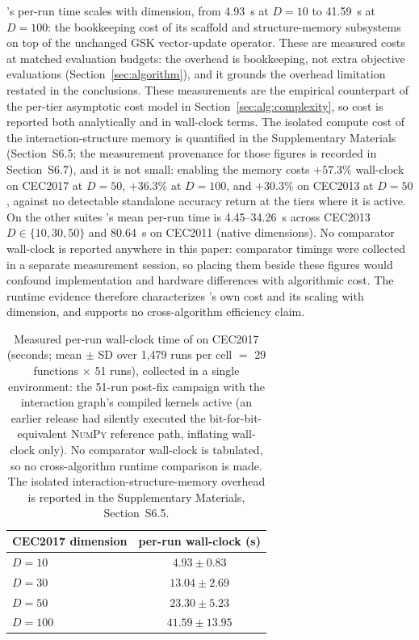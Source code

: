 \dtgsk{}'s per-run time scales with dimension, from 4.93~s at $D = 10$ to
41.59~s at $D = 100$: the bookkeeping cost of its scaffold and
structure-memory subsystems on top of the unchanged GSK vector-update operator. These are
measured costs at matched evaluation budgets: the overhead is bookkeeping, not
extra objective evaluations (Section~\ref{sec:algorithm}), and it grounds the
overhead limitation restated in the conclusions. These measurements are the
empirical counterpart of the per-tier asymptotic cost model in
Section~\ref{sec:alg:complexity}, so cost is reported both analytically and in
wall-clock terms. The isolated compute cost of
the interaction-structure memory is quantified in the Supplementary Materials
(Section~S6.5; the measurement provenance for those figures is recorded in
Section~S6.7), and it is not small: enabling the memory costs $+57.3\%$
wall-clock on CEC2017 at $D = 50$, $+36.3\%$ at $D = 100$, and $+30.3\%$ on
CEC2013 at $D = 50$, against no detectable standalone accuracy return at the
tiers where it is active. On the other suites \dtgsk{}'s mean per-run time is
4.45--34.26~s across CEC2013 $D \in \{10, 30, 50\}$ and 80.64~s on CEC2011
(native dimensions). No comparator wall-clock is reported anywhere in this
paper: comparator timings were collected in a separate measurement session, so
placing them beside these figures would confound implementation and hardware
differences with algorithmic cost. The runtime evidence therefore characterizes
\dtgsk{}'s own cost and its scaling with dimension, and supports no
cross-algorithm efficiency claim.

\begin{table}[H]
\caption{Measured per-run wall-clock time of \dtgsk{} on CEC2017 (seconds; mean
$\pm$ SD over 1{,}479 runs per cell $=$ 29 functions $\times$ 51 runs), collected
in a single environment: the 51-run post-fix campaign with the interaction
graph's compiled kernels active (an earlier release had silently executed the
bit-for-bit-equivalent \textsc{NumPy} reference path, inflating wall-clock only).
No comparator wall-clock is tabulated, so no cross-algorithm runtime comparison
is made. The isolated
interaction-structure-memory overhead is reported in the Supplementary Materials,
Section~S6.5.}\label{tab:runtime}
\centering
\tablesize{\footnotesize}
\zebra
\begin{tabular}{lc}
\toprule
\textbf{CEC2017 dimension} & \textbf{\dtgsk{} per-run wall-clock (s)} \\
\midrule
$D = 10$ & $4.93 \pm 0.83$ \\
$D = 30$ & $13.04 \pm 2.69$ \\
$D = 50$ & $23.30 \pm 5.23$ \\
$D = 100$ & $41.59 \pm 13.95$ \\
\bottomrule
\end{tabular}
\end{table}

